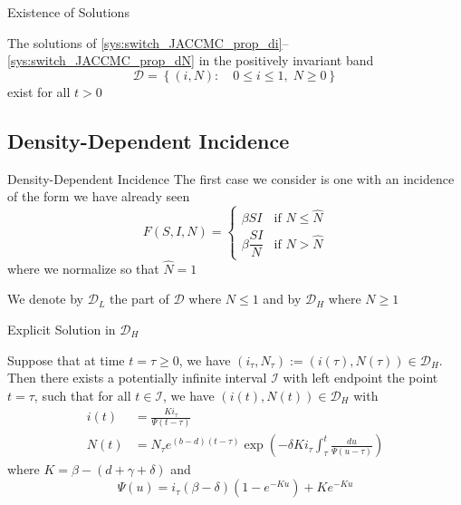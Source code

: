 \documentclass[aspectratio=169]{beamer}\usepackage[]{graphicx}\usepackage[]{xcolor}
\begin{document}
\begin{frame}{Existence of Solutions}
\begin{theorem}
The solutions of \eqref{sys:switch_JACCMC_prop_di}--\eqref{sys:switch_JACCMC_prop_dN} in the positively invariant band
\[
\mathcal{D}=\left\{
(i,N):\quad 0\leq i\leq 1,\;N\geq 0  
\right\}
\]
exist for all $t>0$
\end{theorem}
\end{frame}

\subsection{Density-Dependent Incidence}

\begin{frame}{Density-Dependent Incidence}
\bbullet The first case we consider is one with an incidence of the form we have already seen
\begin{equation}
\tag{9}
F(S,I,N) = 
\begin{cases}
\beta SI & \textrm{if }N\leq \hat{N} \\
\beta \dfrac{SI}{N} & \textrm{if }N> \hat{N}
\end{cases}
\end{equation}
where we normalize so that $\hat{N}=1$

\bbullet We denote by $\mathcal{D}_L$ the part of $\mathcal{D}$ where $N\leq 1$ and by $\mathcal{D}_H$ where $N\geq 1$
\end{frame}

\begin{frame}{Explicit Solution in $\mathcal{D}_H$}
\begin{theorem}
Suppose that at time $t=\tau\geq 0$, we have $(i_\tau,N_\tau):=(i(\tau),N(\tau))\in\mathcal{D}_H$. Then there exists a potentially infinite interval $\mathcal{I}$ with left endpoint the point $t=\tau$, such that for all $t\in\mathcal{I}$, we have $(i(t),N(t))\in\mathcal{D}_H$ with
\begin{align}
i(t) &= \frac{Ki_\tau}{\Psi(t-\tau)} \\
N(t) &= N_\tau e^{(b-d)(t-\tau)}\exp\left(
  -\delta Ki_\tau\int_\tau^t\frac{du}{\Psi(u-\tau)}
\right)
\end{align}
where $K=\beta-(d+\gamma+\delta)$ and 
\[
\Psi(u)=i_\tau(\beta-\delta)(1-e^{-Ku})+Ke^{-Ku}
\]
\end{theorem}
\end{frame}
\end{document}
